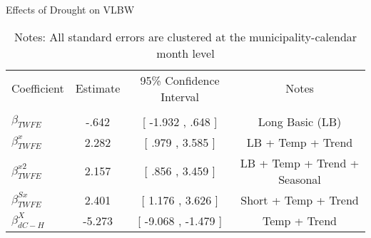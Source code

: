 \begin{table}[!ht]
\centering
\caption{Effects of Drought on VLBW}\label{tab:twfe_vlbw_test}
\renewcommand{\arraystretch}{1.5}
\fontsize{10pt}{12pt}\selectfont
\begin{tabular}{lccc}
\toprule
 \multicolumn{1}{c}{Coefficient}  &\multicolumn{1}{c}{Estimate}&\multicolumn{1}{c}{95\% Confidence Interval}&\multicolumn{1}{c}{Notes}\\\cmidrule(lr){2-2}\cmidrule(lr){3-3}\cmidrule(lr){4-4} \\
\midrule
 $ \beta_{TWFE} $ & -.642  & [ -1.932 ,  .648 ] & Long Basic (LB) \\
 $ \beta^{x}_{TWFE} $ & 2.282  &  [ .979 ,  3.585  ] & LB + Temp + Trend \\
 $ \beta^{x2}_{TWFE} $ & 2.157  & [ .856 ,  3.459  ] & LB + Temp + Trend + Seasonal \\
 $ \beta^{Sx}_{TWFE} $ & 2.401  & [ 1.176 ,  3.626  ] & Short + Temp + Trend \\
 $ \beta^{X}_{dC-H} $ & -5.273  & [ -9.068 ,  -1.479 ] & Temp + Trend \\
\bottomrule
\end{tabular}
\caption*{\footnotesize{Notes: All standard errors are clustered at the municipality-calendar month level}}
\end{table}
